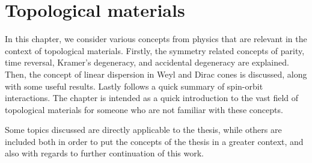 \documentclass[
draft,
paper=B5,
]{scrbook}
\begin{document}
% 
\frontmatter
\tableofcontents

\mainmatter
\chapter{Topological materials}
In this chapter, we consider various concepts from physics that are relevant in the context of topological materials.
Firstly, the symmetry related concepts of parity, time reversal, Kramer's degeneracy, and accidental degeneracy are explained.
Then, the concept of linear dispersion in Weyl and Dirac cones is discussed, along with some useful results.
Lastly follows a quick summary of spin-orbit interactions.
The chapter is intended as a quick introduction to the vast field of topological materials for someone who are not familiar with these concepts.

Some topics discussed are directly applicable to the thesis, while others are included both in order to put the concepts of the thesis in a greater context, and also with regards to further continuation of this work.








% 

% 

% 
% 
% 
% 
\end{document}
